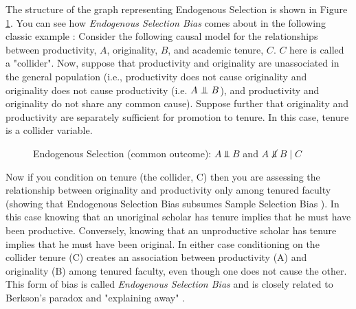 \documentclass[11pt, oneside]{article}   	%
\newcommand\independent{\protect\mathpalette{\protect\independenT}{\perp}}
\def\independenT#1#2{\mathrel{\rlap{$#1#2$}\mkern2mu{#1#2}}}
\begin{document}
The structure of the graph representing Endogenous Selection is shown in Figure \ref{fig:collider}.  You can see how \emph{Endogenous Selection Bias}
comes about in the following classic example \cite{doi:10.1146/annurev-soc-071913-043455}:  Consider the following causal model for the 
relationships between productivity, $A$, originality, $B$, 
and academic tenure, $C$. $C$ here is called a "collider". 
Now, suppose that productivity and originality are unassociated in the general population (i.e., productivity does not cause originality and originality does 
not cause productivity (i.e. $A \independent B$), and productivity and originality do not share any common cause). 
Suppose further that originality and productivity are separately sufficient for promotion to tenure.  In this case, tenure is a collider variable. 


\begin{figure}
\caption{Endogenous Selection (common outcome): $A \Vbar B$ and $A \not \Vbar B \mid C$}
\label{fig:collider}
\end{figure}

\bigskip
\noindent
Now if you condition on tenure (the collider, C) then you are assessing the relationship between originality and productivity only among tenured faculty (showing 
that Endogenous Selection Bias subsumes Sample Selection Bias \cite{2008arXiv0805.2775C}). In this case knowing that an unoriginal scholar has tenure implies 
that he must have been productive. Conversely, knowing that an unproductive scholar has tenure implies that he must have been original. In either case conditioning 
on the collider tenure (C) creates an association between productivity (A) and originality (B) among  tenured faculty, even though one does not cause the other. This form 
of bias is called \emph{Endogenous Selection Bias} and is closely related to Berkson's paradox \cite{Westreich2012} and "explaining away"  \cite{Wellman:1993:EEA:628299.628453}.
\end{document}
